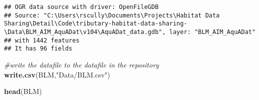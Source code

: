 \documentclass[]{article}
\newenvironment{Shaded}{\begin{snugshade}}{\end{snugshade}}
\newcommand{\CommentTok}[1]{\textcolor[rgb]{0.56,0.35,0.01}{\textit{#1}}}
\newcommand{\KeywordTok}[1]{\textcolor[rgb]{0.13,0.29,0.53}{\textbf{#1}}}
\newcommand{\NormalTok}[1]{#1}
\newcommand{\StringTok}[1]{\textcolor[rgb]{0.31,0.60,0.02}{#1}}
\begin{document}
\begin{verbatim}
## OGR data source with driver: OpenFileGDB 
## Source: "C:\Users\rscully\Documents\Projects\Habitat Data Sharing\Detail\Code\tributary-habitat-data-sharing-\Data\BLM_AIM_AquADat\v104\AquADat_data.gdb", layer: "BLM_AIM_AquADat"
## with 1442 features
## It has 96 fields
\end{verbatim}

\begin{Shaded}
\begin{Highlighting}[]
\CommentTok{#write the datafile to the datafile in the repository}
\KeywordTok{write.csv}\NormalTok{(BLM,}\StringTok{"Data/BLM.csv"}\NormalTok{)}

\KeywordTok{head}\NormalTok{(BLM)}
\end{Highlighting}
\end{Shaded}
\end{document}

